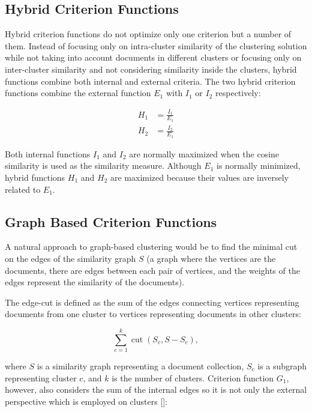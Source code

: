 \subsection{Hybrid Criterion Functions}
Hybrid criterion functions do not optimize only one criterion but a number of them. Instead of focusing only on intra-cluster similarity of the clustering solution while not taking into account documents in different clusters or focusing only on inter-cluster similarity and not considering similarity inside the clusters, hybrid functions combine both internal and external criteria. The two hybrid criterion functions combine the external function $E_{1}$ with $I_{1}$ or $I_{2}$ respectively:


\begin{align*}
H_{1} & =\frac{I_{1}}{E_{1}}  \tag{12.18}\\
H_{2} & =\frac{I_{2}}{E_{1}} \tag{12.19}
\end{align*}


Both internal functions $I_{1}$ and $I_{2}$ are normally maximized when the cosine similarity is used as the similarity measure. Although $E_{1}$ is normally minimized, hybrid functions $H_{1}$ and $H_{2}$ are maximized because their values are inversely related to $E_{1}$.

\subsection{Graph Based Criterion Functions}
A natural approach to graph-based clustering would be to find the minimal cut on the edges of the similarity graph $S$ (a graph where the vertices are the documents, there are edges between each pair of vertices, and the weights of the edges represent the similarity of the documents).

The edge-cut is defined as the sum of the edges connecting vertices representing documents from one cluster to vertices representing documents in other clusters:


\begin{equation*}
\sum_{c=1}^{k} \operatorname{cut}\left(S_{c}, S-S_{c}\right), \tag{12.20}
\end{equation*}


where $S$ is a similarity graph representing a document collection, $S_{c}$ is a subgraph representing cluster $c$, and $k$ is the number of clusters. Criterion function $G_{1}$, however, also considers the sum of the internal edges so it is not only the external perspective which is employed on clusters [\cite{ref73}]:


